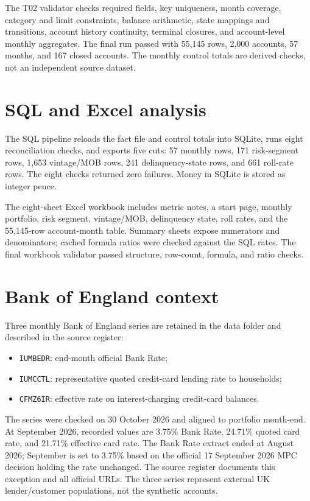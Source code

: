 \documentclass[11pt]{article}
\begin{document}
The T02 validator checks required fields, key uniqueness, month coverage, category and limit constraints, balance arithmetic, state mappings and transitions, account history continuity, terminal closures, and account-level monthly aggregates. The final run passed with 55,145 rows, 2,000 accounts, 57 months, and 167 closed accounts. The monthly control totals are derived checks, not an independent source dataset.

\section{SQL and Excel analysis}

The SQL pipeline reloads the fact file and control totals into SQLite, runs eight reconciliation checks, and exports five cuts: 57 monthly rows, 171 risk-segment rows, 1,653 vintage/MOB rows, 241 delinquency-state rows, and 661 roll-rate rows. The eight checks returned zero failures. Money in SQLite is stored as integer pence.

The eight-sheet Excel workbook includes metric notes, a start page, monthly portfolio, risk segment, vintage/MOB, delinquency state, roll rates, and the 55,145-row account-month table. Summary sheets expose numerators and denominators; cached formula ratios were checked against the SQL rates. The final workbook validator passed structure, row-count, formula, and ratio checks.

\section{Bank of England context}

Three monthly Bank of England series are retained in the data folder and described in the source register:

\begin{itemize}
\item \texttt{IUMBEDR}: end-month official Bank Rate;
\item \texttt{IUMCCTL}: representative quoted credit-card lending rate to households;
\item \texttt{CFMZ6IR}: effective rate on interest-charging credit-card balances.
\end{itemize}

The series were checked on 30 October 2026 and aligned to portfolio month-end. At September 2026, recorded values are 3.75\% Bank Rate, 24.71\% quoted card rate, and 21.71\% effective card rate. The Bank Rate extract ended at August 2026; September is set to 3.75\% based on the official 17 September 2026 MPC decision holding the rate unchanged. The source register documents this exception and all official URLs. The three series represent external UK lender/customer populations, not the synthetic accounts.
\end{document}
